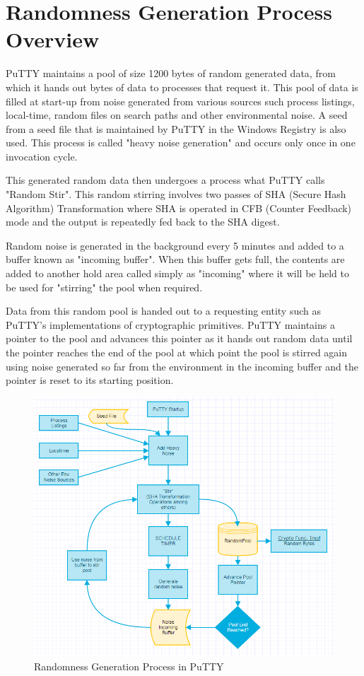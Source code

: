 \documentclass{report}
\begin{document}
\section{Randomness Generation Process Overview}
PuTTY maintains a pool of size 1200 bytes of random generated data, from which it hands out bytes of data to processes that request it. This pool of data is filled at start-up from noise generated from various sources such process listings, local-time, random files on search paths and other environmental noise. A seed from a seed file that is maintained by PuTTY in the Windows Registry is also used. This process is called "heavy noise generation" and occurs only once in one invocation cycle.\par
This generated random data then undergoes a process what PuTTY calls "Random Stir". This random stirring involves two passes of SHA (Secure Hash Algorithm) Transformation where SHA is operated in CFB (Counter Feedback) mode and the output is repeatedly fed back to the SHA digest.\par
Random noise is generated in the background every 5 minutes and added to a buffer known as "incoming buffer". When this buffer gets full, the contents are added to another hold area called simply as "incoming" where it will be held to be used for "stirring" the pool when required.\par
Data from this random pool is handed out to a requesting entity such as PuTTY's implementations of cryptographic primitives. PuTTY maintains a pointer to the pool and advances this pointer as it hands out random data until the pointer reaches the end of the pool at which point the pool is stirred again using noise generated so far from the environment in the incoming buffer and the pointer is reset to its starting position.\par
\begin{figure}[ht]
\caption{Randomness Generation Process in PuTTY}
\centering
\includegraphics[width=1\textwidth]{NG.png}
\end{figure}
\end{document}
